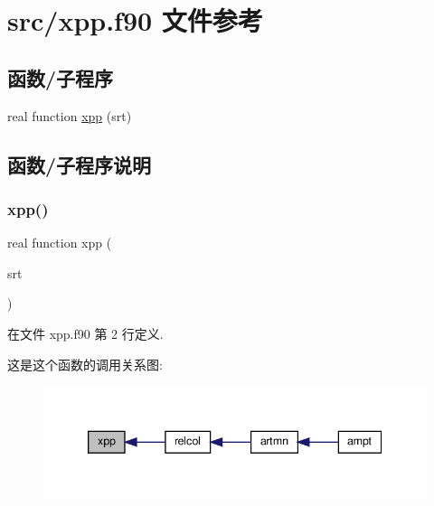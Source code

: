 \hypertarget{xpp_8f90}{}\section{src/xpp.f90 文件参考}
\label{xpp_8f90}
\subsection*{函数/子程序}
\begin{DoxyCompactItemize}
\item 
real function \mbox{\hyperlink{xpp_8f90_aa5b5f3cb282412860757c2aeabb644ac}{xpp}} (srt)
\end{DoxyCompactItemize}


\subsection{函数/子程序说明}
\mbox{\label{xpp_8f90_aa5b5f3cb282412860757c2aeabb644ac}} 
\subsubsection{\texorpdfstring{xpp()}{xpp()}}
{\footnotesize\ttfamily real function xpp (\begin{DoxyParamCaption}\item[{}]{srt }\end{DoxyParamCaption})}



在文件 xpp.\+f90 第 2 行定义.

这是这个函数的调用关系图\+:
\nopagebreak
\begin{figure}[H]
\begin{center}
\leavevmode
\includegraphics[width=339pt]{xpp_8f90_aa5b5f3cb282412860757c2aeabb644ac_icgraph}
\end{center}
\end{figure}
